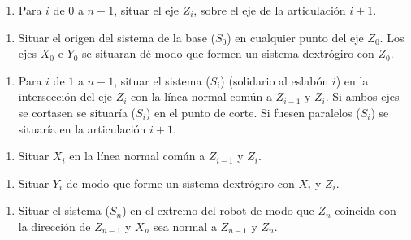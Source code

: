 \documentclass[twoside]{article}
\begin{document}
\begin{multicols}{2}
\begin{enumerate}
\def\labelenumi{\arabic{enumi}.}
\setcounter{enumi}{3}
\itemsep1pt\parskip0pt
\item
  Para \(i\) de \(0\) a \(n-1\), situar el eje \(Z_i\), sobre el eje de
  la articulación \(i+1\).
\end{enumerate}

\begin{enumerate}
\def\labelenumi{\arabic{enumi}.}
\setcounter{enumi}{4}
\itemsep1pt\parskip0pt
\item
  Situar el origen del sistema de la base (\(S_0\)) en cualquier punto
  del eje \(Z_0\). Los ejes \(X_0\) e \(Y_0\) se situaran dé modo que
  formen un sistema dextrógiro con \(Z_0\).
\end{enumerate}

\begin{enumerate}
\def\labelenumi{\arabic{enumi}.}
\setcounter{enumi}{5}
\itemsep1pt\parskip0pt
\item
  Para \(i\) de \(1\) a \(n-1\), situar el sistema (\(S_i\)) (solidario
  al eslabón \(i\)) en la intersección del eje \(Z_i\) con la línea
  normal común a \(Z_{i-1}\) y \(Z_i\). Si ambos ejes se cortasen se
  situaría (\(S_i\)) en el punto de corte. Si fuesen paralelos (\(S_i\))
  se situaría en la articulación \(i+1\).
\end{enumerate}

\begin{enumerate}
\def\labelenumi{\arabic{enumi}.}
\setcounter{enumi}{6}
\itemsep1pt\parskip0pt
\item
  Situar $X_i$ en la línea normal común a $Z_{i-1}$ y $Z_{i}$.
\end{enumerate}

\begin{enumerate}
\def\labelenumi{\arabic{enumi}.}
\setcounter{enumi}{7}
\itemsep1pt\parskip0pt
\item
  Situar $Y_i$ de modo que forme un sistema dextrógiro con $X_i$ y $Z_i$.
\end{enumerate}

\begin{enumerate}
\def\labelenumi{\arabic{enumi}.}
\setcounter{enumi}{8}
\itemsep1pt\parskip0pt
\item
  Situar el sistema ($S_n$) en el extremo del robot de modo que $Z_n$ coincida
  con la dirección de $Z_{n-1}$ y $X_n$ sea normal a $Z_{n-1}$ y $Z_n$.
\end{enumerate}


\end{multicols}
\end{document}
